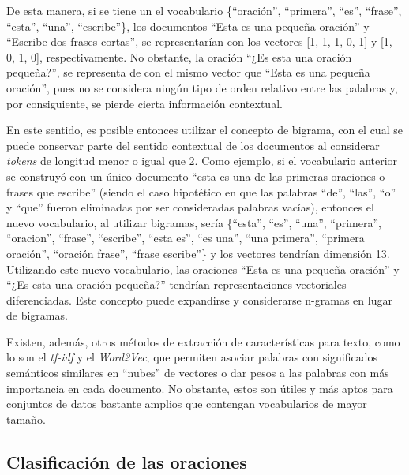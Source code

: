 \documentclass[conference]{IEEEtran}
\begin{document}
        De esta manera, si se tiene un el vocabulario \{``oración'', ``primera'', ``es'', ``frase'', ``esta'', ``una'', ``escribe''\}, los documentos ``Esta es una pequeña oración'' y ``Escribe dos frases cortas'', se representarían con los vectores [1, 1, 1, 0, 1] y [1, 0, 1, 0], respectivamente. No obstante, la oración ``¿Es esta una oración pequeña?'', se representa de con el mismo vector que ``Esta es una pequeña oración'', pues no se considera ningún tipo de orden relativo entre las palabras y, por consiguiente, se pierde cierta información contextual.
        
        En este sentido, es posible entonces utilizar el concepto de bigrama, con el cual se puede conservar parte del sentido contextual de los documentos al considerar \textit{tokens} de longitud menor o igual que 2. Como ejemplo, si el vocabulario anterior se construyó con un único documento ``esta es una de las primeras oraciones o frases que escribe'' (siendo el caso hipotético en que las palabras ``de'', ``las'', ``o'' y ``que'' fueron eliminadas por ser consideradas palabras vacías), entonces el nuevo vocabulario, al utilizar bigramas, sería \{``esta'', ``es'', ``una'', ``primera'', ``oracion'', ``frase'', ``escribe'', ``esta es'', ``es una'', ``una primera'', ``primera oración'', ``oración frase'', ``frase escribe''\} y los vectores tendrían dimensión 13. Utilizando este nuevo vocabulario, las oraciones ``Esta es una pequeña oración'' y ``¿Es esta una oración pequeña?'' tendrían representaciones vectoriales diferenciadas. Este concepto puede expandirse y considerarse n-gramas en lugar de bigramas.
        
        Existen, además, otros métodos de extracción de características para texto, como lo son el \textit{tf-idf} y el \textit{Word2Vec}, que permiten asociar palabras con significados semánticos similares en ``nubes'' de vectores o dar pesos a las palabras con más importancia en cada documento. No obstante, estos son útiles y más aptos para conjuntos de datos bastante amplios que contengan vocabularios de mayor tamaño.
    
    
    
    
    \subsection{Clasificación de las oraciones}
    
\end{document}
